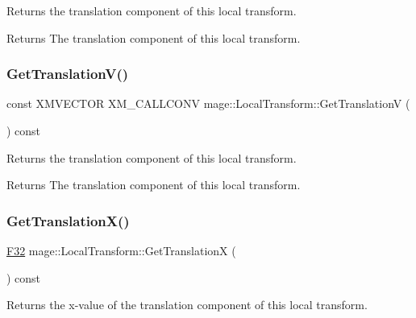 Returns the translation component of this local transform.

\begin{DoxyReturn}{Returns}
The translation component of this local transform. 
\end{DoxyReturn}
\mbox{\label{classmage_1_1_local_transform_a18dc6111bfca7d24f3f24e2c1dff8d0b}} 
\subsubsection{\texorpdfstring{Get\+Translation\+V()}{GetTranslationV()}}
{\footnotesize\ttfamily const X\+M\+V\+E\+C\+T\+OR X\+M\+\_\+\+C\+A\+L\+L\+C\+O\+NV mage\+::\+Local\+Transform\+::\+Get\+TranslationV (\begin{DoxyParamCaption}{ }\end{DoxyParamCaption}) const\hspace{0.3cm}{\ttfamily [noexcept]}}

Returns the translation component of this local transform.

\begin{DoxyReturn}{Returns}
The translation component of this local transform. 
\end{DoxyReturn}
\mbox{\label{classmage_1_1_local_transform_ae021c17cf996088044a9c4f7be1601b8}} 
\subsubsection{\texorpdfstring{Get\+Translation\+X()}{GetTranslationX()}}
{\footnotesize\ttfamily \mbox{\hyperlink{namespacemage_aa97e833b45f06d60a0a9c4fc22ae02c0}{F32}} mage\+::\+Local\+Transform\+::\+Get\+TranslationX (\begin{DoxyParamCaption}{ }\end{DoxyParamCaption}) const\hspace{0.3cm}{\ttfamily [noexcept]}}

Returns the x-\/value of the translation component of this local transform.

